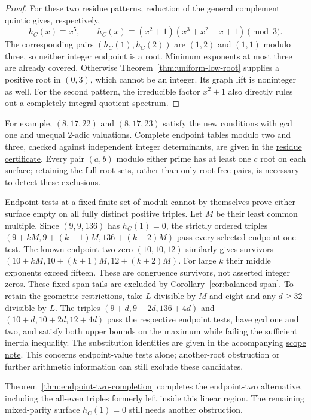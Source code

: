 \begin{proof}
For these two residue patterns, reduction of the general complement
quintic gives, respectively,
\[
h_C(x)\equiv x^5,\qquad
h_C(x)\equiv(x^2+1)(x^3+x^2-x+1)\pmod3.
\]
The corresponding pairs $(h_C(1),h_C(2))$ are $(1,2)$ and $(1,1)$
modulo three, so neither integer endpoint is a root. Minimum exponents
at most three are already covered. Otherwise
Theorem~\ref{thm:uniform-low-root} supplies a positive root in $(0,3)$,
which cannot be an integer. Its graph lift is noninteger as well.
For the second pattern, the irreducible factor $x^2+1$ also directly
rules out a completely integral quotient spectrum.
\end{proof}

For example, $(8,17,22)$ and $(8,17,23)$ satisfy the new conditions
with gcd one and unequal $2$-adic valuations. Complete endpoint tables
modulo two and three, checked against independent integer determinants,
are given in the \href{https://github.com/the-omega-institute/ideal-intersection-laplacian/blob/2df3cffd062ce0b28fc2040a6203fd4e7282a725/results/endpoint-residues.json}{residue certificate}.
Every pair $(a,b)$ modulo either prime has at least one $c$ root on
each surface; retaining the full root sets, rather than only root-free
pairs, is necessary to detect these exclusions.

\begin{remark}
Endpoint tests at a fixed finite set of moduli cannot by themselves
prove either surface empty on all fully distinct positive triples.
Let $M$ be their least common multiple. Since $(9,9,136)$ has
$h_C(1)=0$, the strictly ordered triples
$(9+kM,9+(k+1)M,136+(k+2)M)$ pass every selected endpoint-one test.
The known endpoint-two zero $(10,10,12)$ similarly gives survivors
$(10+kM,10+(k+1)M,12+(k+2)M)$. For large $k$ their middle exponents
exceed fifteen. These are congruence survivors, not asserted integer
zeros. These fixed-span tails are excluded by
Corollary~\ref{cor:balanced-span}. To retain the geometric restrictions,
take $L$ divisible by $M$ and eight and any $d\geq32$ divisible by $L$.
The triples $(9+d,9+2d,136+4d)$ and $(10+d,10+2d,12+4d)$ pass the
respective endpoint tests, have gcd one and two, and satisfy both upper
bounds on the maximum while failing the sufficient inertia inequality.
The substitution identities are given in the accompanying
\href{https://github.com/the-omega-institute/ideal-intersection-laplacian/blob/nikandish-math-patch-1/notes/endpoint-congruence-scope.md}{scope note}.
This concerns endpoint-value tests alone; another-root obstruction or
further arithmetic information can still exclude these candidates.
\end{remark}

Theorem~\ref{thm:endpoint-two-completion} completes the endpoint-two
alternative, including the all-even triples formerly left inside this
linear region. The remaining mixed-parity surface $h_C(1)=0$ still
needs another obstruction.
